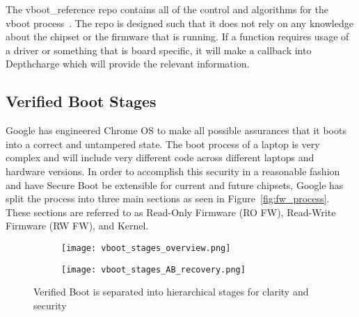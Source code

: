 \documentclass[../report.tex]{subfiles}
\begin{document}
The vboot\_reference repo contains all of the control and algorithms for the vboot process~\cite{vboot-codebase}.
The repo is designed such that it does not rely on any knowledge about the chipset or the firmware that is running. 
If a function requires usage of a driver or something that is board specific, it will make a callback into Depthcharge which will provide the relevant information.

%


\subsection{Verified Boot Stages}

Google has engineered Chrome OS to make all possible assurances that it boots into a correct and untampered state. 
The boot process of a laptop is very complex and will include very different code across different laptops and hardware versions. 
In order to accomplish this security in a reasonable fashion and have Secure Boot be extensible for current and future chipsets, Google has split the process into three main sections as seen in Figure~\ref{fig:fw_process}.
These sections are referred to as Read-Only Firmware (RO FW), Read-Write Firmware (RW FW), and Kernel.

\begin{figure}
\begin{subfigure}{.4\textwidth}
  \centering
  \texttt{[image: vboot\_stages\_overview.png]}
\end{subfigure}%
\begin{subfigure}{.60\textwidth}
  \centering
  \texttt{[image: vboot\_stages\_AB\_recovery.png]}
\end{subfigure}
\caption{Verified Boot is separated into hierarchical stages for clarity and security}
\label{fig:vboot_stages_overview}
\end{figure}

\end{document}

